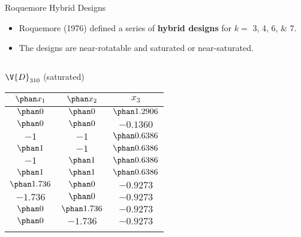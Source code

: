 \documentclass[9pt]{beamer}
\begin{document}
\begin{frame}{Roquemore Hybrid Designs}

\begin{itemize}
	\item Roquemore (1976) defined a series of \textbf{hybrid designs} for $k =$ 3, 4, 6, \& 7.
	\item The designs are near-rotatable and saturated or near-saturated.
\end{itemize}

\begin{columns}
\begin{column}{0.5\textwidth}
	\begin{center}
		$\V{D}_{310}$ (saturated)
		\medskip
		\begin{tabular}{ccc}
			\toprule
			$\phan x_1$ & $\phan x_2$ & $x_3$ \\
			\midrule
			$\phan0$ & $\phan0$ & $\phan1.2906$ \vphantom{$\sqrt{2}$} \\
			$\phan0$ & $\phan0$ & $-0.1360$ \vphantom{$\sqrt{2}$} \\
			$-1$ & $-1$ & $\phan0.6386$ \vphantom{$\sqrt{2}$} \\
			$\phan1$ & $-1$ & $\phan0.6386$ \vphantom{$\sqrt{2}$} \\
			$-1$ & $\phan1$ & $\phan0.6386$ \vphantom{$\sqrt{2}$} \\
			$\phan1$ & $\phan1$ & $\phan0.6386$ \vphantom{$\sqrt{2}$} \\
			$\phan1.736$ & $\phan0$ & $-0.9273$ \vphantom{$\sqrt{2}$} \\
			$-1.736$ & $\phan0$ & $-0.9273$ \vphantom{$\sqrt{2}$} \\
			$\phan0$ & $\phan1.736$ & $-0.9273$ \vphantom{$\sqrt{2}$} \\
			$\phan0$ & $-1.736$ & $-0.9273$ \vphantom{$\sqrt{2}$} \\
			\bottomrule
			\vphantom{$\sqrt{2}$} \\
		\end{tabular}
	\end{center}
\end{column}


\end{columns}
\end{frame}
\end{document}
